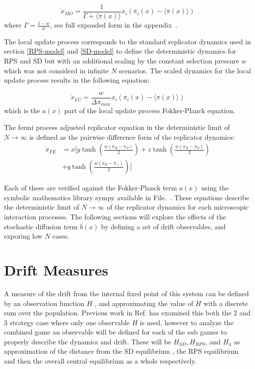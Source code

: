\documentclass[%
 reprint,
 amsmath,amssymb,
 aps,
]{revtex4-2}
\begin{document}
\begin{equation}
\dot{x}_{MO} = \frac{1}{\Gamma + \langle \pi(x)\rangle} x_i(\pi_i(x) - \langle \pi(x)\rangle)
\end{equation}
where $\Gamma = \frac{1- w}{w}$, see full expanded form in the appendix~\cite{project_appendix}.

The local update process corresponds to the standard replicator 
dynamics \cite{evolution_pop_dynamics} used in section
\ref{RPS-model} and \ref{SD-model} to define the deterministic dynamics
for RPS and SD but with an additional scaling by the
constant selection pressure
$w$ which was not considerd in infinite $N$ scenarios.
The scaled dynamics for the local update process results in the following equation:

\begin{equation}
\dot{x}_{LU} = \frac{w}{\Delta \pi_{max}}x_i(\pi_i(x) - \langle \pi(x) \rangle)
\end{equation}
which is the $a(x)$ part of the local update process Fokker-Planck equation.


The fermi process adjusted replicator equation in the deterministic limit 
of $N \rightarrow \infty$ is defined as the pairwise difference form of the 
replicator dynamics:
\begin{align}
\dot{x}_{FE} &= x \Big[
    y \tanh\!\left(\frac{w(\pi_R - \pi_P)}{2}\right)
  + z \tanh\!\left(\frac{w(\pi_R - \pi_S)}{2}\right)\nonumber \\
  &+ q \tanh\!\left(\frac{w(\pi_R - \pi_+)}{2}\right)
\Big]
\end{align}

Each of these are verified against the Fokker-Planck term $a(x)$ using the symbolic mathematics library sympy available in 
File.~\cite{aug_rps}. These equations describe the deterministic limit of $N \rightarrow \infty$ of the replicator
dynamics
for each microscopic interaction processes.
The following sections will explore the effects of the stochastic diffusion term $b(x)$ by defining a set of 
drift observables, and exporing low $N$ cases.



\section{\label{sec:drift_measures}Drift Measures}

A measure of the drift from the internal fixed point of this system can be defined by
an observation function $H$ \cite{Claussen2007-zo,drift_reversal_paper,rps_cyclic_jens}, and 
approximating the value of $\dot{H}$ with a discrete sum over the population.
Previous work in Ref. \cite{Claussen2007-zo,drift_reversal_paper,rps_cyclic_jens} has
examined this both the 2 and 3 strategy case where only one observable $H$ is used, however
to analyze the combined game an observable will be defined for each of the sub games to 
properly describe the dynamics and drift. These will be $H_{SD}, H_{RPS}$, and $H_4$ 
as approximation of the distance from the SD equilibrium , the RPS equilibrium and then the 
overall central equilibrium as a whole respectively.
\end{document}
